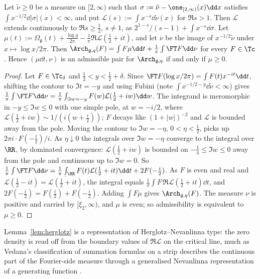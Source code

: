 \begin{lemma}\label{lem:herglotz}
Let $\tilde\nu\ge0$ be a measure on $[2,\infty)$ such that $\sigma:=\tilde\nu-\one_{[2,\infty)}(x)\dd x$ satisfies
$\int x^{-1/2}\dd\lvert\sigma\rvert(x)<\infty$, and put $\mathcal L(s):=\int x^{-s}\dd\tilde\nu(x)$ for $\Re s>1$. Then $\mathcal L$ extends
continuously to $\Re s\ge\frac12$, $s\ne1$, as $2^{1-s}/(s-1)+\int x^{-s}\dd\sigma$. Let
$\mu(t):=\Omega_{\mathfrak g}(t)+\frac{\log q}{2\pi}-\frac1\pi\Re\mathcal L(\frac12+it)$, and let $\nu$ be the image of $x^{-1/2}\tilde\nu$ under
$x\mapsto\log x/2\pi$. Then $\Arch_{\mathfrak g,q}(F)=\int F\mu\dd t+\frac1\pi\int\FT F\dd\nu$ for every $F\in\Tc$. Hence $(\mu\dd t,\nu)$ is an
admissible pair for $\Arch_{\mathfrak g,q}$ if and only if $\mu\ge0$.
\end{lemma}

\begin{proof}
Let $F\in\Tc_\delta$ and $\frac12<y<\frac12+\delta$. Since $\FT F(\log x/2\pi)=\int F(t)x^{-it}\dd t$, shifting the contour
to $\Im t=-y$ and using Fubini (note $\int x^{-1/2-y}\dd\tilde\nu<\infty$) gives
$\frac1\pi\int\FT F\dd\nu=\frac1\pi\int_{\Im w=-y}F(w)\mathcal L(\frac12+iw)\dd w$. The integrand is meromorphic in
$-y\le\Im w\le0$ with one simple pole, at $w=-i/2$, where $\mathcal L(\frac12+iw)\sim1/(i(w+\frac i2))$; $F$ decays like
$(1+\lvert w\rvert)^{-2}$ and $\mathcal L$ is bounded away from the pole. Moving the contour to $\Im w=-\eta$, $0<\eta<\frac12$, picks up
$2\pi i\cdot F(-\frac i2)/i$. As $\eta\downarrow0$ the integrals over $\Im w=-\eta$ converge to the integral over $\RR$, by dominated
convergence: $\mathcal L(\frac12+iw)$ is bounded on $-\frac14\le\Im w\le0$ away from the pole and continuous up to $\Im w=0$. So
$\frac1\pi\int\FT F\dd\nu=\frac1\pi\int_\RR F(t)\mathcal L(\frac12+it)\dd t+2F(-\frac i2)$. As $F$ is even and real and
$\mathcal L(\frac12-it)=\overline{\mathcal L(\frac12+it)}$, the integral equals $\frac1\pi\int F\,\Re\mathcal L(\frac12+it)\dd t$, and
$2F(-\frac i2)=F(\frac i2)+F(-\frac i2)$. Adding $\int F\mu$ gives $\Arch_{\mathfrak g,q}(F)$. The measure $\nu$ is positive
and carried by $[\xi_2,\infty)$, and $\mu$ is even; so admissibility is equivalent to $\mu\ge0$.
\end{proof}

Lemma~\ref{lem:herglotz} is a representation of Herglotz--Nevanlinna type: the zero density is read off from the boundary values of
$\Re\mathcal L$ on the critical line, much as Vedana's classification of summation formulas on a strip describes the continuous part of
the Fourier-side measure through a generalised Nevanlinna representation of a generating function \cite{Ved26}.

